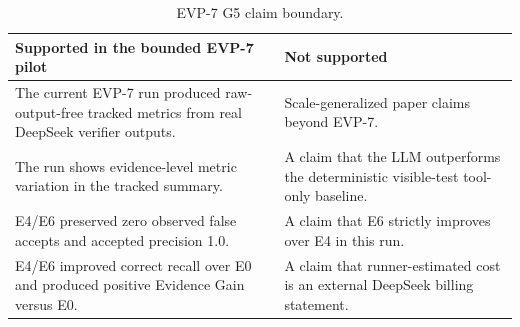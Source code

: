 \begin{table}[t]
\centering
\caption{EVP-7 G5 claim boundary.}
\label{tab:evp7-claim-boundary}
\begin{tabular}{p{}p{}}
\toprule
Supported in the bounded EVP-7 pilot & Not supported \\
\midrule
The current EVP-7 run produced raw-output-free tracked metrics from real DeepSeek verifier outputs. & Scale-generalized paper claims beyond EVP-7. \\
The run shows evidence-level metric variation in the tracked summary. & A claim that the LLM outperforms the deterministic visible-test tool-only baseline. \\
E4/E6 preserved zero observed false accepts and accepted precision 1.0. & A claim that E6 strictly improves over E4 in this run. \\
E4/E6 improved correct recall over E0 and produced positive Evidence Gain versus E0. & A claim that runner-estimated cost is an external DeepSeek billing statement. \\
\bottomrule
\end{tabular}
\end{table}
